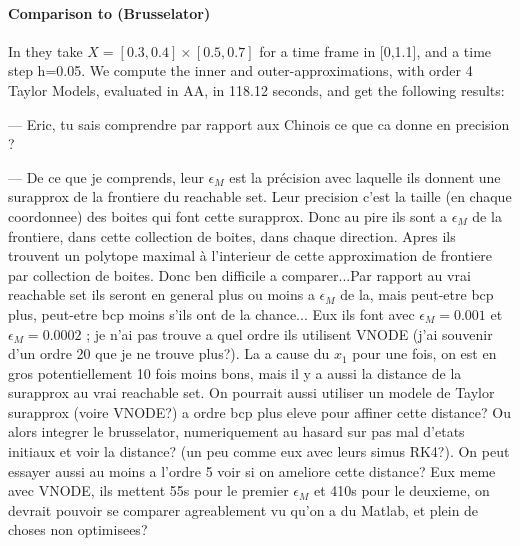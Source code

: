 \documentclass{sig-alternate-05-2015} %
\newcommand\ForAuthors[1]%
 {\par\smallskip                     %
  \begin{center}%
   \fbox%
   {\parbox{0.9\linewidth}%
    {\raggedright\sc--- #1}%
   }%
  \end{center}%
  \par\smallskip                     %
 }
\begin{document}
\paragraph{Comparison to \cite{underapprox16} (Brusselator)}
In \cite{underapprox16} they take $X=[0.3, 0.4] \times [0.5, 0.7]$ for a time frame in [0,1.1], and a time step h=0.05. 
We compute the inner and outer-approximations, with order 4 Taylor Models, evaluated in AA, in 118.12 seconds, 
and get the following results:
\begin{center}
\end{center}
\begin{center}
\end{center}
\begin{center}
\end{center}
\ForAuthors{Eric, tu sais comprendre par rapport aux Chinois ce que ca donne en precision ?}
\ForAuthors{De ce que je comprends, leur $\epsilon_M$ est la pr\'ecision
avec laquelle ils donnent une surapprox de la frontiere du reachable set.
Leur precision c'est la taille (en chaque coordonnee) des boites qui 
font cette surapprox. Donc au pire ils sont a $\epsilon_M$ de la frontiere,
dans cette collection de boites, dans chaque direction. Apres ils trouvent
un polytope maximal \`a l'interieur de cette approximation de frontiere
par collection de boites. Donc ben difficile a comparer...Par rapport
au vrai reachable set ils seront en general plus ou moins a $\epsilon_M$
de la, mais peut-etre bcp plus, peut-etre bcp moins s'ils ont de la chance...
Eux ils font avec $\epsilon_M=0.001$ et $\epsilon_M=0.0002$ ; je n'ai 
pas trouve a quel ordre ils utilisent VNODE (j'ai souvenir d'un ordre
20 que je ne trouve plus?). La a cause du $x_1$ pour une fois, on est
en gros potentiellement 10 fois moins bons, mais il y a aussi la distance
de la surapprox au vrai reachable set. On pourrait aussi utiliser un 
modele de Taylor surapprox (voire VNODE?) a ordre bcp plus eleve pour
affiner cette distance? Ou alors integrer le brusselator, numeriquement
au hasard sur pas mal d'etats initiaux et voir la distance? (un peu comme
eux avec leurs simus RK4?). On peut essayer aussi au moins a l'ordre 5
voir si on ameliore cette distance? Eux meme avec VNODE, ils mettent
55s pour le premier $\epsilon_M$ et 410s pour le deuxieme, on devrait
pouvoir se comparer agreablement vu qu'on a du Matlab, et plein de choses
non optimisees?}
\end{document}

